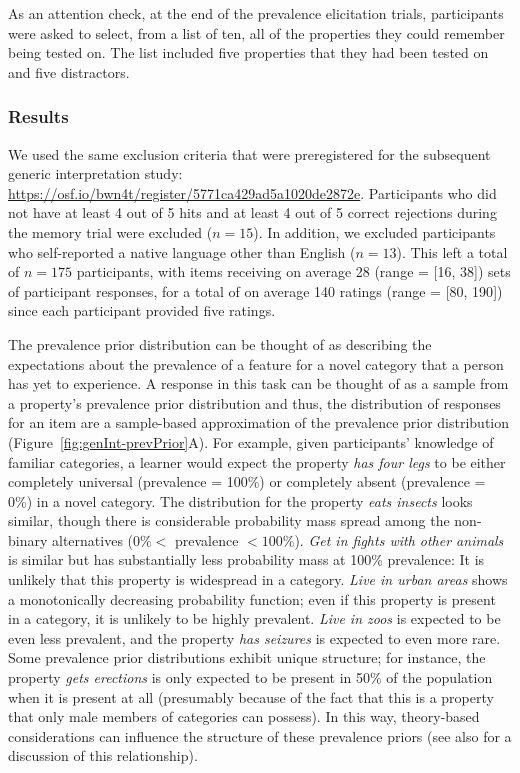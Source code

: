 \documentclass[floatsintext,man]{apa6}
\begin{document}
As an attention check, at the end of the prevalence elicitation trials, participants were asked to select, from a list of ten, all of the properties they could remember being tested on.
The list included five properties that they had been tested on and five distractors.

\hypertarget{results}{%
\subsubsection{Results}\label{results}}
We used the same exclusion criteria that were preregistered for the subsequent generic interpretation study: \url{https://osf.io/bwn4t/register/5771ca429ad5a1020de2872e}.
Participants who did not have at least 4 out of 5 hits and at least 4 out of 5 correct rejections during the memory trial were excluded (\(n = 15\)).
In addition, we excluded participants who self-reported a native language other than English (\(n = 13\)).
This left a total of \(n = 175\) participants, with items receiving on average 28 (range = {[}16, 38{]}) sets of participant responses, for a total of on average 140 ratings (range = {[}80, 190{]}) since each participant provided five ratings.

The prevalence prior distribution can be thought of as describing the expectations about the prevalence of a feature for a novel category that a person has yet to experience. 
A response in this task can be thought of as a sample from a property's prevalence prior distribution and thus, the distribution of responses for an item are a sample-based approximation of the prevalence prior distribution (Figure~\ref{fig:genInt-prevPrior}A). 
For example, given participants' knowledge of familiar categories, a learner would expect the property \emph{has four legs} to be either completely universal (prevalence = 100\%) or completely absent (prevalence = 0\%) in a novel category.
The distribution for the property \emph{eats insects} looks similar, though there is considerable probability mass spread among the non-binary alternatives (\(0\% <\) prevalence \(< 100\%\)).
\emph{Get in fights with other animals} is similar but has substantially less probability mass at 100\% prevalence: It is unlikely that this property is widespread in a category.
\emph{Live in urban areas} shows a monotonically decreasing probability function; even if this property is present in a category, it is unlikely to be highly prevalent. 
\emph{Live in zoos} is expected to be even less prevalent, and the property \emph{has seizures} is expected to even more rare.
Some prevalence prior distributions exhibit unique structure; for instance,  the property \emph{gets erections} is only expected to be present in 50\% of the population when it is present at all (presumably because of the fact that this is a property that only male members of categories can possess). In this way, theory-based considerations can influence the structure of these prevalence priors (see also  for a discussion of this relationship). 
\end{document}
